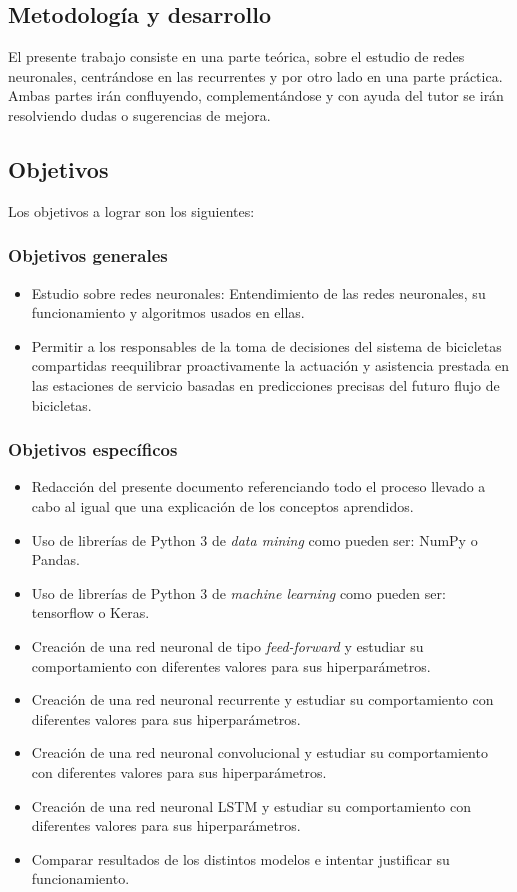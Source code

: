 \subsection{Metodología y desarrollo}
El presente trabajo consiste en una parte teórica, sobre el estudio de redes neuronales, centrándose en las recurrentes y por otro lado en una parte práctica. Ambas partes irán confluyendo, complementándose y con ayuda del tutor se irán resolviendo dudas o sugerencias de mejora.

\subsection{Objetivos}
Los objetivos a lograr son los siguientes:
\subsubsection{Objetivos generales}
\begin{itemize}
    \item Estudio sobre redes neuronales: Entendimiento de las redes neuronales, su funcionamiento y algoritmos usados en ellas.
    \item Permitir a los responsables de la toma de decisiones del sistema de bicicletas compartidas reequilibrar proactivamente la actuación y asistencia prestada en las estaciones de servicio basadas en predicciones precisas del futuro flujo de bicicletas.
\end{itemize}

\subsubsection{Objetivos específicos}
\begin{itemize}
    \item Redacción del presente documento referenciando todo el proceso llevado a cabo al igual que una explicación de los conceptos aprendidos.
    \item Uso de librerías de Python 3 de \textit{data mining} como pueden ser: NumPy o Pandas.
    \item Uso de librerías de Python 3 de \textit{machine learning} como pueden ser: tensorflow o Keras.
    \item Creación de una red neuronal de tipo \textit{feed-forward} y estudiar su comportamiento con diferentes valores para sus hiperparámetros.
    \item Creación de una red neuronal recurrente y estudiar su comportamiento con diferentes valores para sus hiperparámetros.
    \item Creación de una red neuronal convolucional y estudiar su comportamiento con diferentes valores para sus hiperparámetros.
    \item Creación de una red neuronal LSTM y estudiar su comportamiento con diferentes valores para sus hiperparámetros.
    \item Comparar resultados de los distintos modelos e intentar justificar su funcionamiento.
\end{itemize}